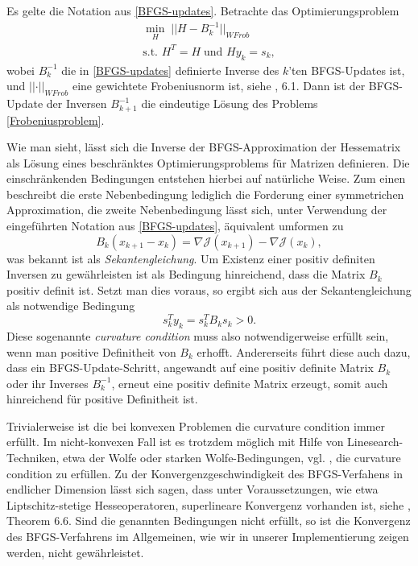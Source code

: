 \begin{theorem}
		
	Es gelte die Notation aus \ref{BFGS-updates}. Betrachte das Optimierungsproblem
	\begin{equation}\label{Frobeniusproblem}
	\begin{aligned}
		\underset{H}{\min}\; \vert\vert H - B_k^{-1} \vert\vert _{WFrob} \\
		\text{s.t. } H^T = H\; \text{und } H y_k = s_k,
	\end{aligned}
	\end{equation}
	wobei $B_k^{-1}$ die in \ref{BFGS-updates} definierte Inverse des $k$'ten BFGS-Updates ist, und \newline
$\vert\vert \cdot \vert\vert_{WFrob}$ 
eine gewichtete Frobeniusnorm ist, siehe \cite{Nocedal}, 6.1. Dann ist der BFGS-Update der Inversen $B_{k+1}^{-1}$ die eindeutige Lösung des Problems \ref{Frobeniusproblem}.
\end{theorem}
Wie man sieht, lässt sich die Inverse der BFGS-Approximation der Hessematrix als Lösung eines beschränktes Optimierungsproblems für Matrizen definieren. Die einschränkenden Bedingungen entstehen hierbei auf natürliche Weise. Zum einen beschreibt die erste Nebenbedingung lediglich die Forderung einer symmetrichen Approximation, die zweite Nebenbedingung lässt sich, unter Verwendung der eingeführten Notation aus \ref{BFGS-updates}, äquivalent umformen zu
\begin{equation}
	B_k (x_{k+1} - x_k) = \nabla \mathcal{J}(x_{k+1}) - \nabla \mathcal{J}(x_k),
\end{equation}
was bekannt ist als \textit{Sekantengleichung}. Um Existenz einer positiv definiten Inversen zu gewährleisten ist als Bedingung hinreichend, dass die Matrix $B_k$ positiv definit ist. Setzt man dies voraus, so ergibt sich aus der Sekantengleichung als notwendige Bedingung
\begin{equation}
	s_k^T y_k = s_k^T B_k s_k > 0.
\end{equation}
Diese sogenannte \textit{curvature condition} muss also notwendigerweise erfüllt sein, wenn man positive Definitheit von $B_k$ erhofft. Andererseits führt diese auch dazu, dass ein BFGS-Update-Schritt, angewandt auf eine positiv definite Matrix $B_k$ oder ihr Inverses $B_k^{-1}$, erneut eine positiv definite Matrix erzeugt, somit auch hinreichend für positive Definitheit ist. 

Trivialerweise ist die bei konvexen Problemen die curvature condition immer erfüllt. Im nicht-konvexen Fall ist es trotzdem möglich mit Hilfe von Linesearch-Techniken, etwa der Wolfe oder starken Wolfe-Bedingungen, vgl. \cite{Nocedal}, die curvature condition zu erfüllen. Zu der Konvergenzgeschwindigkeit des BFGS-Verfahens in endlicher Dimension lässt sich sagen, dass unter Voraussetzungen, wie etwa Liptschitz-stetige Hesseoperatoren, superlineare Konvergenz vorhanden ist, siehe \cite{Nocedal}, Theorem 6.6. Sind die genannten Bedingungen nicht erfüllt, so ist die Konvergenz des BFGS-Verfahrens im Allgemeinen, wie wir in unserer Implementierung zeigen werden, nicht gewährleistet.


